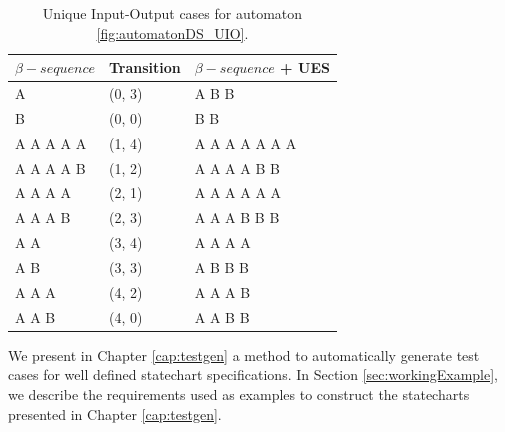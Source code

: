 \begin{table}
\begin{center}
\begin{tabular}{| l | l| l|}

\hline

$\beta-sequence$ & Transition & $\beta-sequence$ + UES \\ \hline

A & (0, 3) & A B B\\ \hline
B & (0, 0) & B B\\ \hline
A A A A A & (1, 4) & A A A A A A A\\ \hline
A A A A B & (1, 2) & A A A A B B \\ \hline
A A A A & (2, 1) & A A A A A A\\ \hline
A A A B & (2, 3) & A A A B B B\\ \hline
A A & (3, 4) & A A A A\\ \hline
A B & (3, 3) & A B B B\\ \hline
A A A & (4, 2) & A A A B \\ \hline
A A B & (4, 0) & A A B B \\
\hline
\end{tabular}
\end{center}
\caption{Unique Input-Output cases for automaton \ref{fig:automatonDS_UIO}.\cite{inpe10}}
\label{tableUES_2}
\end{table}

We present in Chapter \ref{cap:testgen} a method to automatically generate test cases for well defined statechart specifications. In Section \ref{sec:workingExample}, we describe the requirements used as examples to construct the statecharts presented in Chapter \ref{cap:testgen}.


